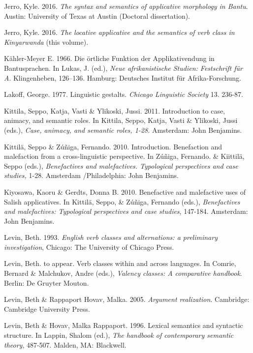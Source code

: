 Jerro, Kyle. 2016. \textit{The syntax and semantics of applicative morphology in Bantu}. Austin: University of Texas at Austin (Doctoral dissertation). 

Jerro, Kyle. 2016. \textit{The locative applicative and the semantics of verb class in Kinyarwanda} (this volume).

Kähler-Meyer E. 1966. Die örtliche Funktion der Applikativendung in Bantusprachen. In Lukas, J. (ed.), \textit{Neue afrikanistische Studien: Festschrift für A}. Klingenheben, 126–136. Hamburg: Deutsches Institut für Afrika-Forschung.

Lakoff, George. 1977. Linguistic gestalts. \textit{Chicago Linguistic Society }13. 236-87.

Kittila, Seppo, Katja, Vasti \& Ylikoski, Jussi. 2011. Introduction to case, animacy, and semantic roles. In Kittila, Seppo, Katja, Vasti \& Ylikoski, Jussi (eds.), \textit{Case, animacy,   and semantic roles, 1-28.} Amsterdam: John Benjamins.

Kittilä, Seppo \& Zúñiga, Fernando. 2010. Introduction. Benefaction and malefaction from a cross-linguistic perspective. In Zúñiga, Fernando. \& Kiittil\"{a}, Seppo (eds.), \textit{Benefactives and malefactives. Typological perspectives and case studies, }1-28. Amsterdam /Philadelphia: John Benjamins.

Kiyosawa, Kaoru \& Gerdts, Donna B. 2010. Benefactive and malefactive uses of Salish applicatives. In Kittilä, Seppo, \& Zúñiga, Fernando (eds.), \textit{Benefactives and malefactives: Typological perspectives and case studies}, 147-184. Amsterdam: John Benjamins.

\begin{styleNormalWeb}
Levin, Beth. 1993. \textit{English verb classes and alternations: a preliminary investigation}, Chicago: The   University of Chicago Press.   
\end{styleNormalWeb}

\begin{styleNormalWeb}
Levin, Beth. to appear. Verb classes within and across languages. In Comrie, Bernard \& Malchukov, Andre (eds.), \textit{Valency classes: A comparative handbook}. Berlin: De Gruyter Mouton.
\end{styleNormalWeb}

Levin, Beth \& Rappaport Hovav, Malka. 2005. \textit{Argument realization}. Cambridge: Cambridge University Press.

Levin, Beth \& Hovav, Malka Rappaport. 1996. Lexical semantics and syntactic structure. In Lappin, Shalom (ed.), \textit{The handbook of contemporary semantic theory}, 487-507. Malden, MA: Blackwell.

